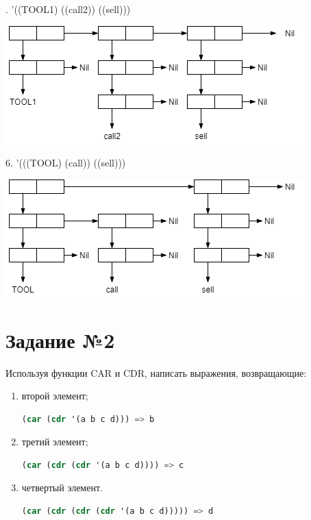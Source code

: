 . '((TOOL1) ((call2)) ((sell)))\newline

\includegraphics[scale=0.8]{img/1.5}

6. '(((TOOL) (call)) ((sell)))\newline

\includegraphics[scale=0.8]{img/1.6}

\section{Задание №2}

Используя функции $\text{CAR}$ и $\text{CDR}$, написать выражения,
возвращающие:
\begin{enumerate}
	\item второй элемент;

	\begin{lstlisting}[language=Lisp]
		(car (cdr '(a b c d))) => b
	\end{lstlisting}
	
	\item третий элемент;
	
	\begin{lstlisting}[language=Lisp]
		(car (cdr (cdr '(a b c d)))) => c
	\end{lstlisting}
	
	\item четвертый элемент.
	
	\begin{lstlisting}[language=Lisp]
		(car (cdr (cdr (cdr '(a b c d))))) => d
	\end{lstlisting}

\end{enumerate}

